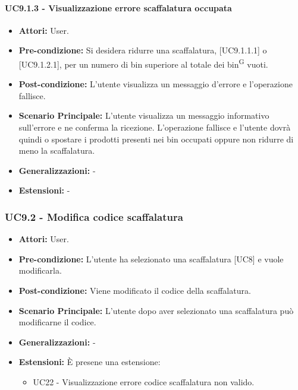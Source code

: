 \paragraph{UC9.1.3 - Visualizzazione errore scaffalatura occupata}
\begin{itemize}
    \item \textbf{Attori:} User.
    \item \textbf{Pre-condizione:} Si desidera ridurre una scaffalatura, [UC9.1.1.1] o [UC9.1.2.1], per un numero di bin superiore al totale dei bin\textsuperscript{G} vuoti.
    \item \textbf{Post-condizione:} L'utente visualizza un messaggio d'errore e l'operazione fallisce.
    \item \textbf{Scenario Principale:} L'utente visualizza un messaggio informativo sull'errore e ne conferma la ricezione. L'operazione fallisce e l'utente dovrà quindi o spostare i prodotti presenti nei bin occupati oppure non ridurre di meno la scaffalatura.
    \item \textbf{Generalizzazioni:} -
    \item \textbf{Estensioni:} -
\end{itemize}


\subsubsection{UC9.2 - Modifica codice scaffalatura}
\begin{itemize}
    \item \textbf{Attori:} User.
    \item \textbf{Pre-condizione:} L'utente ha selezionato una scaffalatura [UC8] e vuole modificarla.
    \item \textbf{Post-condizione:} Viene modificato il codice della scaffalatura.
    \item \textbf{Scenario Principale:} L'utente dopo aver selezionato una scaffalatura può modificarne il codice.
    \item \textbf{Generalizzazioni:} -
    \item \textbf{Estensioni:} È presene una estensione:
    \begin{itemize}
        \item UC22 - Visualizzazione errore codice scaffalatura non valido.
    \end{itemize}
\end{itemize}


